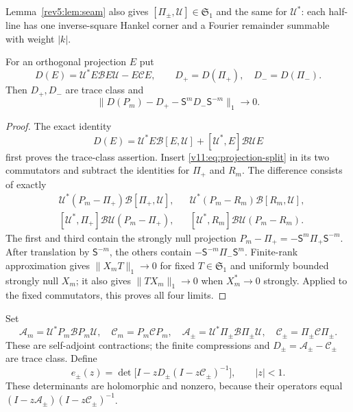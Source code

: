 Lemma~\ref{rev5:lem:seam} also gives $[\Pi_\pm,\mathscr U]\in\mathfrak S_1$
and the same for $\mathscr U^*$: each half-line has one inverse-square
Hankel corner and a Fourier remainder summable with weight $|k|$.

\begin{lemma}\label{v11:lem:gauge-localization}
For an orthogonal projection $E$ put
\[
 D(E)=\mathscr U^*E\mathscr B E\mathscr U-E\mathscr C E,
 \qquad D_+=D(\Pi_+),\quad D_-=D(\Pi_-).
\]
Then $D_+,D_-$ are trace class and
\begin{equation}\label{v11:eq:gauge-localization}
 \|D(P_m)-D_+-\mathsf S^mD_-\mathsf S^{-m}\|_1\longrightarrow0.
\end{equation}
\end{lemma}
\begin{proof}
The exact identity
\begin{equation}\label{v11:eq:D-identity}
 D(E)=\mathscr U^*E\mathscr B[E,\mathscr U]
             +[\mathscr U^*,E]\mathscr B\mathscr U E
\end{equation}
first proves the trace-class assertion.  Insert
\eqref{v11:eq:projection-split} in its two commutators and subtract the
identities for $\Pi_+$ and $R_m$.  The difference consists of exactly
\begin{align*}
 &\mathscr U^*(P_m-\Pi_+)\mathscr B[\Pi_+,\mathscr U],&
 &\mathscr U^*(P_m-R_m)\mathscr B[R_m,\mathscr U],\\
 &[\mathscr U^*,\Pi_+]\mathscr B\mathscr U(P_m-\Pi_+),&
 &[\mathscr U^*,R_m]\mathscr B\mathscr U(P_m-R_m).
\end{align*}
The first and third contain the strongly null projection
$P_m-\Pi_+=-\mathsf S^m\Pi_+\mathsf S^{-m}$. After translation by
$\mathsf S^{-m}$, the others contain $-\mathsf S^{-m}\Pi_-\mathsf S^m$.
Finite-rank approximation gives $\|X_mT\|_1\to0$ for fixed
$T\in\mathfrak S_1$ and uniformly bounded strongly null $X_m$;
it also gives $\|TX_m\|_1\to0$ when $X_m^*\to0$ strongly.
Applied to the fixed commutators, this proves all four limits.
\end{proof}

Set
\[
 \mathscr A_m=\mathscr U^*P_m\mathscr B P_m\mathscr U,
 \quad\mathscr C_m=P_m\mathscr C P_m,
 \quad\mathscr A_\pm=\mathscr U^*\Pi_\pm\mathscr B\Pi_\pm\mathscr U,
 \quad\mathscr C_\pm=\Pi_\pm\mathscr C\Pi_\pm.
\]
These are self-adjoint contractions; the finite compressions and
$D_\pm=\mathscr A_\pm-\mathscr C_\pm$ are trace class. Define
\begin{equation}\label{v11:eq:gauge-det-factors}
 e_\pm(z)=\det\bigl[I-zD_\pm(I-z\mathscr C_\pm)^{-1}\bigr],
 \qquad |z|<1.
\end{equation}
These determinants are holomorphic and nonzero, because their operators
equal $(I-z\mathscr A_\pm)(I-z\mathscr C_\pm)^{-1}$.

